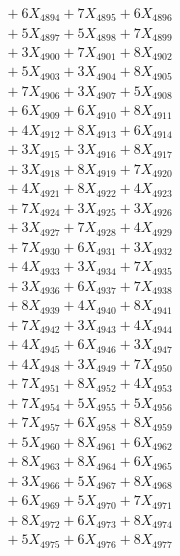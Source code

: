 \documentclass[a4paper,10pt]{article}
\begin{document}
{\begin{align}
&\;  + 6 X_{4894} + 7 X_{4895} + 6 X_{4896} \\[0.3ex]
&\;  + 5 X_{4897} + 5 X_{4898} + 7 X_{4899} \\[0.5ex]\allowbreak
&\;  + 3 X_{4900} + 7 X_{4901} + 8 X_{4902} \\[0.3ex]
&\;  + 5 X_{4903} + 3 X_{4904} + 8 X_{4905} \\[0.3ex]
&\;  + 7 X_{4906} + 3 X_{4907} + 5 X_{4908} \\[0.3ex]
&\;  + 6 X_{4909} + 6 X_{4910} + 8 X_{4911} \\[0.3ex]
&\;  + 4 X_{4912} + 8 X_{4913} + 6 X_{4914} \\[0.3ex]
&\;  + 3 X_{4915} + 3 X_{4916} + 8 X_{4917} \\[0.3ex]
&\;  + 3 X_{4918} + 8 X_{4919} + 7 X_{4920} \\[0.3ex]
&\;  + 4 X_{4921} + 8 X_{4922} + 4 X_{4923} \\[0.3ex]
&\;  + 7 X_{4924} + 3 X_{4925} + 3 X_{4926} \\[0.3ex]
&\;  + 3 X_{4927} + 7 X_{4928} + 4 X_{4929} \\[0.5ex]\allowbreak
&\;  + 7 X_{4930} + 6 X_{4931} + 3 X_{4932} \\[0.3ex]
&\;  + 4 X_{4933} + 3 X_{4934} + 7 X_{4935} \\[0.3ex]
&\;  + 3 X_{4936} + 6 X_{4937} + 7 X_{4938} \\[0.3ex]
&\;  + 8 X_{4939} + 4 X_{4940} + 8 X_{4941} \\[0.3ex]
&\;  + 7 X_{4942} + 3 X_{4943} + 4 X_{4944} \\[0.3ex]
&\;  + 4 X_{4945} + 6 X_{4946} + 3 X_{4947} \\[0.3ex]
&\;  + 4 X_{4948} + 3 X_{4949} + 7 X_{4950} \\[0.3ex]
&\;  + 7 X_{4951} + 8 X_{4952} + 4 X_{4953} \\[0.3ex]
&\;  + 7 X_{4954} + 5 X_{4955} + 5 X_{4956} \\[0.3ex]
&\;  + 7 X_{4957} + 6 X_{4958} + 8 X_{4959} \\[0.5ex]\allowbreak
&\;  + 5 X_{4960} + 8 X_{4961} + 6 X_{4962} \\[0.3ex]
&\;  + 8 X_{4963} + 8 X_{4964} + 6 X_{4965} \\[0.3ex]
&\;  + 3 X_{4966} + 5 X_{4967} + 8 X_{4968} \\[0.3ex]
&\;  + 6 X_{4969} + 5 X_{4970} + 7 X_{4971} \\[0.3ex]
&\;  + 8 X_{4972} + 6 X_{4973} + 8 X_{4974} \\[0.3ex]
&\;  + 5 X_{4975} + 6 X_{4976} + 8 X_{4977} \\[0.3ex]

\end{align}}
\end{document}
